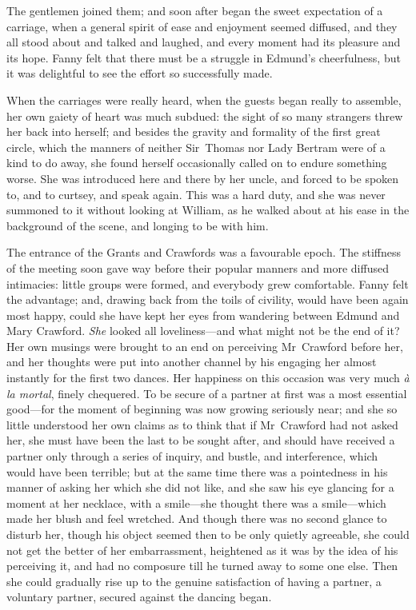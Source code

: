 The gentlemen joined them; and soon after began the sweet expectation of a carriage, when a general spirit of ease and enjoyment seemed diffused, and they all stood about and talked and laughed, and every moment had its pleasure and its hope. Fanny felt that there must be a struggle in Edmund's cheerfulness, but it was delightful to see the effort so successfully made.

When the carriages were really heard, when the guests began really to assemble, her own gaiety of heart was much subdued: the sight of so many strangers threw her back into herself; and besides the gravity and formality of the first great circle, which the manners of neither Sir~Thomas nor Lady Bertram were of a kind to do away, she found herself occasionally called on to endure something worse. She was introduced here and there by her uncle, and forced to be spoken to, and to curtsey, and speak again. This was a hard duty, and she was never summoned to it without looking at William, as he walked about at his ease in the background of the scene, and longing to be with him.

The entrance of the Grants and Crawfords was a favourable epoch. The stiffness of the meeting soon gave way before their popular manners and more diffused intimacies: little groups were formed, and everybody grew comfortable. Fanny felt the advantage; and, drawing back from the toils of civility, would have been again most happy, could she have kept her eyes from wandering between Edmund and Mary Crawford. \textit{She}  looked all loveliness—and what might not be the end of it? Her own musings were brought to an end on perceiving Mr~Crawford before her, and her thoughts were put into another channel by his engaging her almost instantly for the first two dances. Her happiness on this occasion was very much \textit{à la mortal}, finely chequered. To be secure of a partner at first was a most essential good—for the moment of beginning was now growing seriously near; and she so little understood her own claims as to think that if Mr~Crawford had not asked her, she must have been the last to be sought after, and should have received a partner only through a series of inquiry, and bustle, and interference, which would have been terrible; but at the same time there was a pointedness in his manner of asking her which she did not like, and she saw his eye glancing for a moment at her necklace, with a smile—she thought there was a smile—which made her blush and feel wretched. And though there was no second glance to disturb her, though his object seemed then to be only quietly agreeable, she could not get the better of her embarrassment, heightened as it was by the idea of his perceiving it, and had no composure till he turned away to some one else. Then she could gradually rise up to the genuine satisfaction of having a partner, a voluntary partner, secured against the dancing began.

